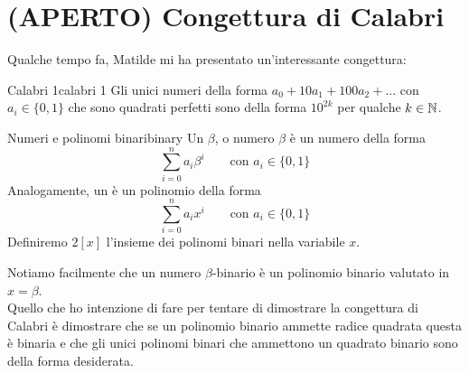 \documentclass[openany]{book}
\begin{document}
\chapter{(APERTO) Congettura di Calabri}

Qualche tempo fa, Matilde mi ha presentato un'interessante congettura:

\begin{proposition}{Calabri 1}{calabri 1}
    Gli unici numeri della forma $a_0+10a_1+100a_2+...$ con $a_i \in \{0,1\}$ che sono quadrati perfetti sono della forma $10^{2k}$ per qualche $k \in \mathbb{N}$.
\end{proposition}

\begin{definition}{Numeri e polinomi binari}{binary}
    Un  $\beta$, o numero $\beta$ è un numero della forma
    \[\sum_{i=0}^n a_i \beta^i \qquad \text{con } a_i \in\{0,1\}\]
    Analogamente, un  è un polinomio della forma
    \[\sum_{i=0}^n a_i x^i \qquad \text{con } a_i \in\{0,1\}\]
    Definiremo $2[x]$ l'insieme dei polinomi binari nella variabile $x$.
\end{definition}

Notiamo facilmente che un numero $\beta$-binario è un polinomio binario valutato in $x=\beta$.\\
Quello che ho intenzione di fare per tentare di dimostrare la congettura di Calabri è dimostrare che se un polinomio binario ammette radice quadrata questa è binaria e che gli unici polinomi binari che ammettono un quadrato binario sono della forma desiderata.
\end{document}
